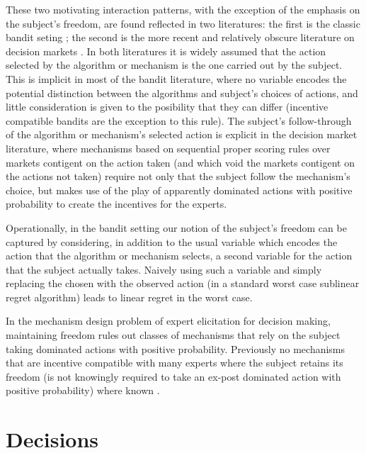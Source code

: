 These two motivating interaction patterns, with the exception of the emphasis on the subject's freedom, are found reflected in two literatures: the first is the classic bandit seting \cite{thompson:33,gittins1979bandit,bubeck:12}; the second is the more recent and relatively obscure literature on decision markets \cite{berg2003prediction,hanson2002decision,othman2010decision,boutilier2012eliciting,chen2014eliciting}. In both literatures it is widely assumed that the action selected by the algorithm or mechanism is the one carried out by the subject. This is implicit in most of the bandit literature, where no variable encodes the potential distinction between the algorithms and subject's choices of actions, and little consideration is given to the posibility that they can differ (incentive compatible bandits are the exception to this rule). The subject's follow-through of the algorithm or mechanism's selected action is explicit in the decision market literature, where mechanisms based on sequential proper scoring rules over markets contigent on the action taken (and which void the markets contigent on the actions not taken) require not only that the subject follow the mechanism's choice, but makes use of the play of apparently dominated actions with positive probability to create the incentives for the experts.

Operationally, in the bandit setting our notion of the subject's freedom can be captured by considering, in addition to the usual variable which encodes the action that the algorithm  or mechanism selects, a second variable for the action that the subject actually takes. Naively using such a variable and simply replacing the chosen with the observed action (in a standard worst case sublinear regret algorithm) leads to linear regret in the worst case.

In the mechanism design problem of expert elicitation for decision making, maintaining freedom rules out classes of mechanisms that rely on the subject taking dominated actions with positive probability. Previously no mechanisms that are incentive compatible with many experts where the subject retains its freedom (is not knowingly required to take an ex-post dominated action with positive probability) where known \cite{othman2010decision,chen2014eliciting}.



\section{Decisions}

